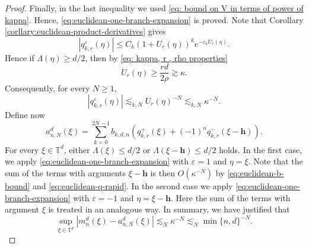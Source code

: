 \documentclass{article}
\newcommand{\T}{\mathbb T}
\theoremstyle{plain}
\numberwithin{equation}{section}
\begin{document}
\begin{proof}
Finally, in the last inequality we used
\eqref{eq: bound on V in terms of power of kappa}. Hence,  \eqref{eq:euclidean-one-branch-expansion} is proved.
Note that Corollary \ref{corllary:euclidean-product-derivatives} gives
\[
 |q_{k,r}^{\varepsilon}(\eta)|
 \leq
 C_k(1+U_r(\eta))^ke^{-c_kU_r(\eta)}.
\]
Hence if \(\Lambda(\eta)\geq d/2\), then  by \eqref{eq: kappa, r , rho properties}
\[
U_r(\eta)
 \geq \frac{rd}{2\rho}
 \gtrsim\kappa.
\]
Consequently, for every \(N\geq1\),
\begin{equation}\label{eq:euclidean-q-rapid}
 |q_{k,r}^{\varepsilon}(\eta)|
 \lesssim_{k,N}
 U_r(\eta)^{-N}\lesssim_{k,N}\kappa^{-N}.
\end{equation}
Define now
\begin{equation}\label{eq:euclidean-a-approximation}
 a_{n,N}^d(\xi)
 =
 \sum_{k=0}^{2N-1}
 b_{k,d,n}
 \left(
 q_{k,r}^{+}(\xi)
 +(-1)^nq_{k,r}^{-}(\xi-\mathbf h)
 \right).
\end{equation}
For every \(\xi \in \T^d\), either
\(\Lambda(\xi)\leq d/2\) or
\(\Lambda(\xi-\mathbf h)\leq d/2\) holds.
In the first case, we apply
\eqref{eq:euclidean-one-branch-expansion} with
\(\varepsilon=1\) and \(\eta=\xi\). Note that the sum of the terms with arguments $\xi-\mathbf h$ is then $O(\kappa^{-N})$ by
\eqref{eq:euclidean-b-bound} and
\eqref{eq:euclidean-q-rapid}.  In the second case we apply
\eqref{eq:euclidean-one-branch-expansion} with
\(\varepsilon=-1\) and \(\eta=\xi-\mathbf h\). Here the sum of the terms with argument $\xi$ is
treated in an analogous way. In summary, we have justified that
\begin{equation}\label{eq:euclidean-arbitrary-order}
 \sup_{\xi\in\mathbb T^d}
 |m_n^d(\xi)-a_{n,N}^d(\xi)|
 \lesssim_N \kappa^{-N}
 \lesssim_N\min\{n,d\}^{-N}.
\end{equation}


\end{proof}
\end{document}
